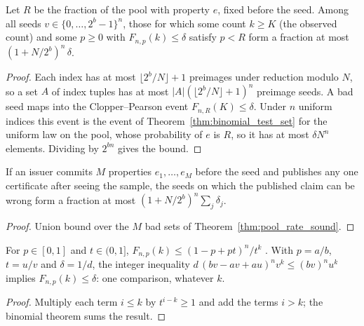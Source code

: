 \begin{theorem}\label{thm:pool_rate_sound}
\leanok
{}
Let $R$ be the fraction of the pool with property $e$, fixed before the seed.
Among all seeds $v\in\{0,\dots,2^b-1\}^n$, those for which some count $k\ge K$
(the observed count) and some $p\ge0$ with $F_{n,p}(k)\le\delta$ satisfy
$p<R$ form a fraction at most $(1+N/2^b)^n\,\delta$.
\end{theorem}
\begin{proof}
\leanok
Each index has at most $\lfloor 2^b/N\rfloor+1$ preimages under reduction
modulo $N$, so a set $A$ of index tuples has at most
$|A|(\lfloor 2^b/N\rfloor+1)^n$ preimage seeds. A bad seed maps into the
Clopper--Pearson event $F_{n,R}(K)\le\delta$. Under $n$ uniform indices this
event is the event of Theorem~\ref{thm:binomial_test_set} for the uniform law
on the pool, whose probability of $e$ is $R$, so it has at most $\delta N^n$
elements. Dividing by $2^{bn}$ gives the bound.
\end{proof}

\begin{corollary}\label{cor:selective_publication}
\leanok
{}
If an issuer commits $M$ properties $e_1,\dots,e_M$ before the seed and
publishes any one certificate after seeing the sample, the seeds on which the
published claim can be wrong form a fraction at most
$(1+N/2^b)^n\sum_j\delta_j$.
\end{corollary}
\begin{proof}
\leanok
Union bound over the $M$ bad sets of Theorem~\ref{thm:pool_rate_sound}.
\end{proof}

\begin{lemma}\label{lem:chernoff_witness}
\leanok
For $p\in[0,1]$ and $t\in(0,1]$, $F_{n,p}(k)\le(1-p+pt)^n/t^k$ \cite{chernoff1952measure}. With
$p=a/b$, $t=u/v$ and $\delta=1/d$, the integer inequality
$d\,(bv-av+au)^n v^k\le (bv)^n u^k$ implies $F_{n,p}(k)\le\delta$: one
comparison, whatever $k$.
\end{lemma}
\begin{proof}
\leanok
Multiply each term $i\le k$ by $t^{i-k}\ge1$ and add the terms $i>k$; the
binomial theorem sums the result.
\end{proof}


